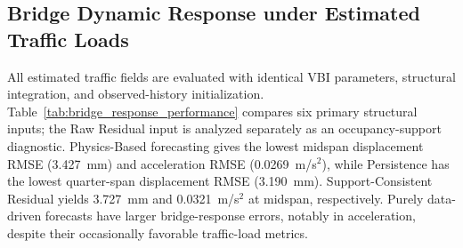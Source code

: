 \documentclass[journal]{IEEEtran}
\begin{document}
\subsection{Bridge Dynamic Response under Estimated Traffic Loads}
\label{sec:bridge_response_results}

All estimated traffic fields are evaluated with identical VBI parameters, structural integration, and observed-history initialization. Table~\ref{tab:bridge_response_performance} compares six primary structural inputs; the Raw Residual input is analyzed separately as an occupancy-support diagnostic. Physics-Based forecasting gives the lowest midspan displacement RMSE (3.427~mm) and acceleration RMSE (0.0269~m/s$^2$), while Persistence has the lowest quarter-span displacement RMSE (3.190~mm). Support-Consistent Residual yields 3.727~mm and 0.0321~m/s$^2$ at midspan, respectively. Purely data-driven forecasts have larger bridge-response errors, notably in acceleration, despite their occasionally favorable traffic-load metrics.
\end{document}
